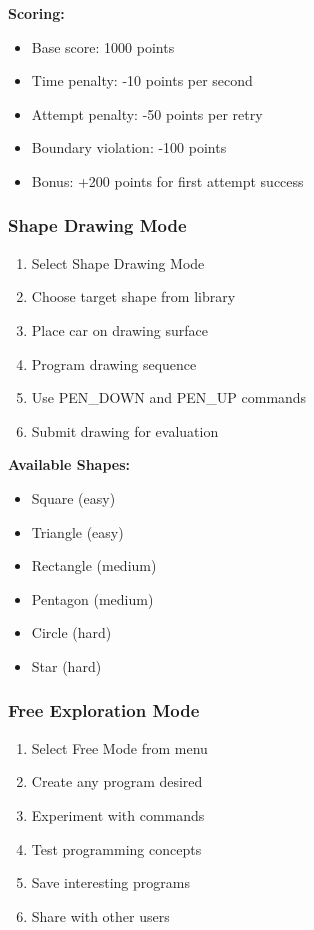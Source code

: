 \textbf{Scoring:}
\begin{itemize}
    \item Base score: 1000 points
    \item Time penalty: -10 points per second
    \item Attempt penalty: -50 points per retry
    \item Boundary violation: -100 points
    \item Bonus: +200 points for first attempt success
\end{itemize}

\subsubsection{Shape Drawing Mode}

\begin{enumerate}
    \item Select Shape Drawing Mode
    \item Choose target shape from library
    \item Place car on drawing surface
    \item Program drawing sequence
    \item Use PEN_DOWN and PEN_UP commands
    \item Submit drawing for evaluation
\end{enumerate}

\textbf{Available Shapes:}
\begin{itemize}
    \item Square (easy)
    \item Triangle (easy)
    \item Rectangle (medium)
    \item Pentagon (medium)
    \item Circle (hard)
    \item Star (hard)
\end{itemize}

\subsubsection{Free Exploration Mode}

\begin{enumerate}
    \item Select Free Mode from menu
    \item Create any program desired
    \item Experiment with commands
    \item Test programming concepts
    \item Save interesting programs
    \item Share with other users
\end{enumerate}

